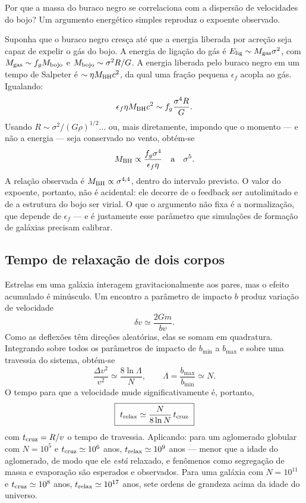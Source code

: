 \documentclass[11pt,a4paper]{article}
\begin{document}
Por que a massa do buraco negro se correlaciona com a dispersão de velocidades do bojo? Um argumento energético simples reproduz o expoente observado.

Suponha que o buraco negro cresça até que a energia liberada por acreção seja capaz de expelir o gás do bojo. A energia de ligação do gás é $E_{\rm lig}\sim M_{\rm gas}\sigma^{2}$, com $M_{\rm gas}\sim f_gM_{\rm bojo}$ e $M_{\rm bojo}\sim\sigma^{2}R/G$. A energia liberada pelo buraco negro em um tempo de Salpeter é $\sim\eta M_{\rm BH}c^{2}$, da qual uma fração pequena $\epsilon_f$ acopla ao gás. Igualando:
\[
\epsilon_f\eta M_{\rm BH}c^{2}\sim f_g\frac{\sigma^{4}R}{G}.
\]
Usando $R\sim\sigma^{2}/(G\rho)^{1/2}\ldots$ ou, mais diretamente, impondo que o momento --- e não a energia --- seja conservado no vento, obtém-se
\[
M_{\rm BH}\propto\frac{f_g\sigma^{4}}{\epsilon_f\eta}\quad\text{a}\quad\sigma^{5}.
\]
A relação observada é $M_{\rm BH}\propto\sigma^{4{,}4}$, dentro do intervalo previsto. O valor do expoente, portanto, não é acidental: ele decorre de o feedback ser autolimitado e de a estrutura do bojo ser virial. O que o argumento não fixa é a normalização, que depende de $\epsilon_f$ --- e é justamente esse parâmetro que simulações de formação de galáxias precisam calibrar.

\subsection*{Tempo de relaxação de dois corpos}

Estrelas em uma galáxia interagem gravitacionalmente aos pares, mas o efeito acumulado é minúsculo. Um encontro a parâmetro de impacto $b$ produz variação de velocidade
\[
\delta v\simeq\frac{2Gm}{bv}.
\]
Como as deflexões têm direções aleatórias, elas se somam em quadratura. Integrando sobre todos os parâmetros de impacto de $b_{\min}$ a $b_{\max}$ e sobre uma travessia do sistema, obtém-se
\[
\frac{\Delta v^{2}}{v^{2}}\simeq\frac{8\ln\Lambda}{N},
\qquad
\Lambda=\frac{b_{\max}}{b_{\min}}\simeq N.
\]
O tempo para que a velocidade mude significativamente é, portanto,
\[
\boxed{\ t_{\rm relax}\simeq\frac{N}{8\ln N}\,t_{\rm cruz}\ }
\]
com $t_{\rm cruz}=R/v$ o tempo de travessia. Aplicando: para um aglomerado globular com $N=10^{5}$ e $t_{\rm cruz}\simeq10^{6}$ anos, $t_{\rm relax}\simeq10^{9}$ anos --- menor que a idade do aglomerado, de modo que ele \emph{está} relaxado, e fenômenos como segregação de massa e evaporação são esperados e observados. Para uma galáxia com $N=10^{11}$ e $t_{\rm cruz}\simeq10^{8}$ anos, $t_{\rm relax}\simeq10^{17}$ anos, sete ordens de grandeza acima da idade do universo.
\end{document}
